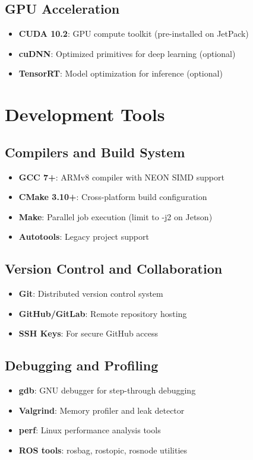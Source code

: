 \subsection{GPU Acceleration}
\begin{itemize}
    \item \textbf{CUDA 10.2}: GPU compute toolkit (pre-installed on JetPack)
    \item \textbf{cuDNN}: Optimized primitives for deep learning (optional)
    \item \textbf{TensorRT}: Model optimization for inference (optional)
\end{itemize}

\section{Development Tools}

\subsection{Compilers and Build System}
\begin{itemize}
    \item \textbf{GCC 7+}: ARMv8 compiler with NEON SIMD support
    \item \textbf{CMake 3.10+}: Cross-platform build configuration
    \item \textbf{Make}: Parallel job execution (limit to -j2 on Jetson)
    \item \textbf{Autotools}: Legacy project support
\end{itemize}

\subsection{Version Control and Collaboration}
\begin{itemize}
    \item \textbf{Git}: Distributed version control system
    \item \textbf{GitHub/GitLab}: Remote repository hosting
    \item \textbf{SSH Keys}: For secure GitHub access
\end{itemize}

\subsection{Debugging and Profiling}
\begin{itemize}
    \item \textbf{gdb}: GNU debugger for step-through debugging
    \item \textbf{Valgrind}: Memory profiler and leak detector
    \item \textbf{perf}: Linux performance analysis tools
    \item \textbf{ROS tools}: rosbag, rostopic, rosnode utilities
\end{itemize}

